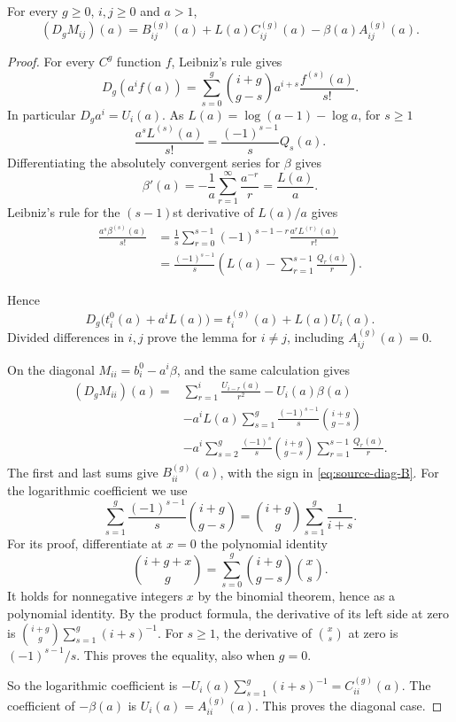 \begin{lemma}\label{lem:source-bank}
For every $g\ge0$, $i,j\ge0$ and $a>1$,
\[
(D_gM_{ij})(a)
 =B^{(g)}_{ij}(a)+L(a)C^{(g)}_{ij}(a)
                   -\beta(a)A^{(g)}_{ij}(a).
\]
\end{lemma}

\begin{proof}
For every $C^g$ function $f$, Leibniz's rule gives
\[
D_g(a^if(a))
 =\sum_{s=0}^{g}\binom{i+g}{g-s}
                  a^{i+s}\frac{f^{(s)}(a)}{s!}.
\]
In particular $D_ga^i=U_i(a)$. As $L(a)=\log(a-1)-\log a$, for $s\ge1$
\[
\frac{a^sL^{(s)}(a)}{s!}
 =\frac{(-1)^{s-1}}sQ_s(a).
\]
Differentiating the absolutely convergent series for $\beta$ gives
\[
\beta'(a)
 =-\frac1a\sum_{r=1}^{\infty}\frac{a^{-r}}r
 =\frac{L(a)}a.
\]
Leibniz's rule for the $(s-1)$st derivative of $L(a)/a$ gives
\[
\begin{aligned}
\frac{a^s\beta^{(s)}(a)}{s!}
 &=\frac1s\sum_{r=0}^{s-1}
       (-1)^{s-1-r}\frac{a^rL^{(r)}(a)}{r!}\\
 &=\frac{(-1)^{s-1}}s
       \left(L(a)-\sum_{r=1}^{s-1}\frac{Q_r(a)}r\right).
\end{aligned}
\]

Hence
\[
D_g\bigl(t_i^0(a)+a^iL(a)\bigr)
 =t_i^{(g)}(a)+L(a)U_i(a).
\]
Divided differences in $i,j$ prove the lemma for $i\ne j$, including
$A^{(g)}_{ij}(a)=0$.

On the diagonal $M_{ii}=b_i^0-a^i\beta$, and the same calculation gives
\[
\begin{aligned}
(D_gM_{ii})(a)
={}&\sum_{r=1}^{i}\frac{U_{i-r}(a)}{r^2}
       -U_i(a)\beta(a)\\
 &-a^iL(a)\sum_{s=1}^{g}
       \frac{(-1)^{s-1}}s\binom{i+g}{g-s}\\
 &-a^i\sum_{s=2}^{g}\frac{(-1)^s}{s}\binom{i+g}{g-s}
            \sum_{r=1}^{s-1}\frac{Q_r(a)}r.
\end{aligned}
\]
The first and last sums give $B^{(g)}_{ii}(a)$, with the sign in
\eqref{eq:source-diag-B}. For the logarithmic coefficient we use
\[
\sum_{s=1}^{g}\frac{(-1)^{s-1}}s\binom{i+g}{g-s}
 =\binom{i+g}{g}\sum_{s=1}^{g}\frac1{i+s}.
\]
For its proof, differentiate at $x=0$ the polynomial identity
\[
\binom{i+g+x}{g}
 =\sum_{s=0}^{g}\binom{i+g}{g-s}\binom{x}{s}.
\]
It holds for nonnegative integers $x$ by the binomial theorem, hence as a
polynomial identity. By the product formula, the derivative of its left
side at zero is $\binom{i+g}{g}\sum_{s=1}^{g}(i+s)^{-1}$. For $s\ge1$, the
derivative of $\binom{x}{s}$ at zero is $(-1)^{s-1}/s$. This proves the
equality, also when $g=0$.

So the logarithmic coefficient is
$-U_i(a)\sum_{s=1}^{g}(i+s)^{-1}=C^{(g)}_{ii}(a)$. The coefficient of
$-\beta(a)$ is $U_i(a)=A^{(g)}_{ii}(a)$. This proves the diagonal case.
\end{proof}

